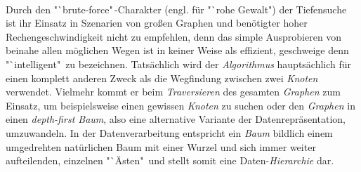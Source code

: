 \documentclass[12pt]{article}
\begin{document}
\\
Durch den "`brute-force"\,-Charakter (engl. für "`rohe Gewalt") der Tiefensuche ist ihr Einsatz in Szenarien von großen Graphen und benötigter hoher Rechengeschwindigkeit nicht zu empfehlen, denn das simple Ausprobieren von beinahe allen möglichen Wegen ist in keiner Weise als effizient, geschweige denn "`intelligent"\ zu bezeichnen. Tatsächlich wird der \textit{Algorithmus} hauptsächlich für einen komplett anderen Zweck als die Wegfindung zwischen zwei \textit{Knoten} verwendet. Vielmehr kommt er beim \textit{Traversieren} des gesamten \textit{Graphen} zum Einsatz, um beispielsweise einen gewissen \textit{Knoten} zu suchen oder den \textit{Graphen} in einen \textit{depth-first Baum}, also eine alternative Variante der Datenrepräsentation, umzuwandeln. In der Datenverarbeitung entspricht ein \textit{Baum} bildlich einem umgedrehten natürlichen Baum mit einer Wurzel und sich immer weiter aufteilenden, einzelnen "`Ästen"\, und stellt somit eine Daten-\textit{Hierarchie} dar.
\end{document}

